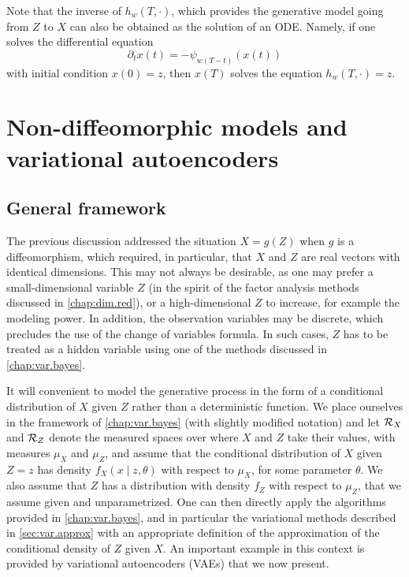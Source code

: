 Note that the inverse of $h_w(T, \cdot)$, which provides the generative model going from $Z$ to $X$ can also be obtained as the solution of an ODE. Namely, if one solves the differential equation
\[
\partial_t x(t) = - \psi_{w(T-t)}(x(t))
\]
with initial condition $x(0) = z$, then $x(T)$ solves the equation $h_w(T, \cdot) = z$.

\section{Non-diffeomorphic models and variational autoencoders}
\label{sec:gen.nondiff}
\subsection{General framework}
The previous discussion addressed the situation  $X = g(Z)$ when $g$ is a diffeomorphism, which required, in particular, that $X$ and $Z$ are real vectors with identical dimensions. This may not always be desirable, as one may prefer a small-dimensional variable $Z$ (in the spirit of the factor analysis methods discussed in \cref{chap:dim.red}), or a high-dimensional $Z$ to increase, for example the modeling power. In addition, the observation variables may be discrete, which precludes the use of the change of variables formula. In such cases, $Z$ has to be treated as a hidden variable using one of the methods discussed in \cref{chap:var.bayes}.  

It will convenient  to model the generative process in the form of a conditional distribution of $X$ given $Z$ rather than a deterministic function. We place ourselves in the framework of \cref{chap:var.bayes} (with slightly modified notation) and let ${\mathcal R}_X$ and ${\mathcal R}_Z$ denote the measured spaces over where $X$ and $Z$ take their values, with measures $\mu_X$ and $\mu_Z$, and assume that the conditional distribution of $X$ given $Z=z$ has density $f_X(x\mid z, \theta)$ with respect to $\mu_X$, for some parameter $\theta$. We also assume that $Z$ has a distribution with density $f_Z$ with respect to $\mu_Z$, that we assume given and unparametrized. One can then directly apply the algorithms provided in \cref{chap:var.bayes}, and in particular the variational methods described in \cref{sec:var.approx} with an appropriate definition of the approximation of the conditional density of $Z$ given $X$. An important example in this context is provided by variational autoencoders (VAEs) that we now present.


